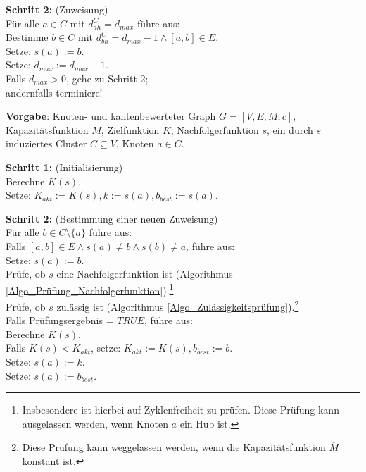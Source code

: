 \noindent 
\textbf{Schritt 2:} (Zuweisung)\\
\phantom \quad Für alle $a \in C$ mit $d^C_{ah} = d_{max}$ führe aus:\\
\phantom \quad \qquad Bestimme $b \in C$ mit $d^C_{bh} = d_{max}-1 \wedge [a,b] \in E$.\\
\phantom \quad \qquad Setze: $s(a) := b$.\\
\phantom \quad Setze: $d_{max} := d_{max}-1$.\\
\phantom \quad Falls $d_{max} > 0$, gehe zu Schritt 2;\\
\phantom \quad andernfalls terminiere!

\newpage
\begin{algo}
\label{Algo_Einfacher_Nachfolgertausch}
\textbf{Vorgabe}: Knoten- und kantenbewerteter Graph $G=[V,E,M,c]$, Kapazitätsfunktion $\overline{M}$, Zielfunktion $K$, Nachfolgerfunktion $s$, ein durch $s$ induziertes Cluster $C \subseteq V$, Knoten $a \in C$.

\noindent 
\textbf{Schritt 1:} (Initialisierung)\\
\phantom \quad Berechne $K(s)$.\\
\phantom \quad Setze: $K_{akt} := K(s), k := s(a), b_{best} := s(a)$.

\noindent 
\textbf{Schritt 2:} (Bestimmung einer neuen Zuweisung)\\
\phantom \quad Für alle $b \in C\setminus\{a\}$ führe aus:\\
\phantom \quad \qquad Falls $[a,b] \in E \wedge s(a) \neq b \wedge s(b) \neq a$, führe aus:\\
\phantom \quad \qquad \qquad Setze: $s(a) := b$.\\
\phantom \quad \qquad \qquad Prüfe, ob $s$ eine Nachfolgerfunktion ist (Algorithmus \ref{Algo_Prüfung_Nachfolgerfunktion}).\footnote{Insbesondere ist hierbei auf Zyklenfreiheit zu prüfen. Diese Prüfung kann ausgelassen werden, wenn Knoten $a$ ein Hub ist.}\\
\phantom \quad \qquad \qquad Prüfe, ob $s$ zulässig ist (Algorithmus \ref{Algo_Zulässigkeitsprüfung}).\footnote{Diese Prüfung kann weggelassen werden, wenn die Kapazitätsfunktion $\overline{M}$ konstant ist.}\\
\phantom \quad \qquad \qquad Falls Prüfungsergebnis = $TRUE$, führe aus:\\
\phantom \quad \qquad \qquad  \qquad Berechne $K(s)$.\\
\phantom \quad \qquad \qquad  \qquad Falls $K(s) < K_{akt}$, setze: $K_{akt} := K(s), b_{best} := b$.\\
\phantom \quad \qquad Setze: $s(a) := k$.\\
\phantom \quad Setze: $s(a) := b_{best}$.
\end{algo}

